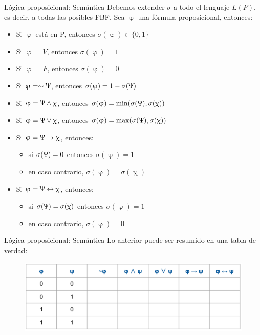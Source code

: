 \documentclass{beamer}
\begin{document}
\begin{frame}{Lógica proposicional: Semántica}
  Debemos extender $\sigma$ a todo el lenguaje $L(P)$, es decir, a todas las
  posibles FBF. Sea $\upvarphi$ una fórmula proposicional, entonces:

  \begin{itemize}[<+->]
    \item Si $\upvarphi$ está en P, entonces $\sigma(\upvarphi) \in \{0, 1\}$
    \item Si $\upvarphi = V$, entonces $\sigma(\upvarphi) = 1$
    \item Si $\upvarphi = F$, entonces $\sigma(\upvarphi) = 0$
    \item Si $\upvarphi = \sim \Uppsi$, entonces
          $\sigma(\upvarphi) = 1 - \sigma(\Uppsi)$
    \item Si $\upvarphi = \Uppsi \land \upchi$, entonces
          $\sigma(\upvarphi) = \min(\sigma(\Uppsi), \sigma(\upchi))$
    \item Si $\upvarphi = \Uppsi \vee \upchi$, entonces
          $\sigma(\upvarphi) = \max(\sigma(\Uppsi), \sigma(\upchi))$
    \item Si $\upvarphi = \Uppsi \rightarrow \upchi$, entonces:
          \begin{itemize}
            \item si $\sigma(\Uppsi) = 0$ entonces $\sigma(\upvarphi) = 1$
            \item en caso contrario, $\sigma(\upvarphi) = \sigma(\upchi)$
          \end{itemize}
    \item Si $\upvarphi = \Uppsi \leftrightarrow \upchi$, entonces:
          \begin{itemize}
            \item si $\sigma(\Uppsi) = \sigma(\upchi)$ entonces
                  $\sigma(\upvarphi) = 1$
            \item en caso contrario, $\sigma(\upvarphi) = 0$
          \end{itemize}
  \end{itemize}
\end{frame}


\begin{frame}{Lógica proposicional: Semántica}
  Lo anterior puede ser resumido en una tabla de verdad:
  \begin{figure}
    \centering
    \includegraphics[width=1.\textwidth]{images/resumen_tabla_de_verdad_blanco.png}
  \end{figure}
\end{frame}
\end{document}
